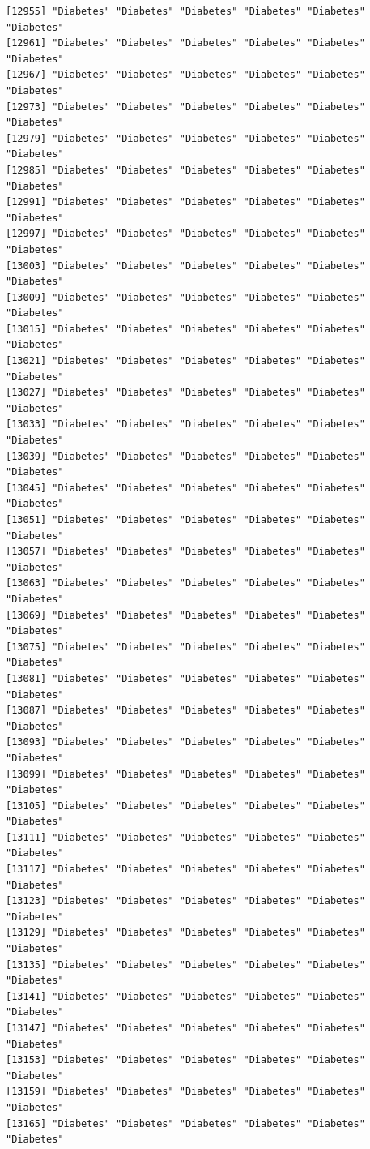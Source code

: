 \documentclass[
  letterpaper,
  DIV=11,
  numbers=noendperiod]{scrartcl}
\begin{document}
\begin{verbatim}
[12955] "Diabetes" "Diabetes" "Diabetes" "Diabetes" "Diabetes" "Diabetes"
[12961] "Diabetes" "Diabetes" "Diabetes" "Diabetes" "Diabetes" "Diabetes"
[12967] "Diabetes" "Diabetes" "Diabetes" "Diabetes" "Diabetes" "Diabetes"
[12973] "Diabetes" "Diabetes" "Diabetes" "Diabetes" "Diabetes" "Diabetes"
[12979] "Diabetes" "Diabetes" "Diabetes" "Diabetes" "Diabetes" "Diabetes"
[12985] "Diabetes" "Diabetes" "Diabetes" "Diabetes" "Diabetes" "Diabetes"
[12991] "Diabetes" "Diabetes" "Diabetes" "Diabetes" "Diabetes" "Diabetes"
[12997] "Diabetes" "Diabetes" "Diabetes" "Diabetes" "Diabetes" "Diabetes"
[13003] "Diabetes" "Diabetes" "Diabetes" "Diabetes" "Diabetes" "Diabetes"
[13009] "Diabetes" "Diabetes" "Diabetes" "Diabetes" "Diabetes" "Diabetes"
[13015] "Diabetes" "Diabetes" "Diabetes" "Diabetes" "Diabetes" "Diabetes"
[13021] "Diabetes" "Diabetes" "Diabetes" "Diabetes" "Diabetes" "Diabetes"
[13027] "Diabetes" "Diabetes" "Diabetes" "Diabetes" "Diabetes" "Diabetes"
[13033] "Diabetes" "Diabetes" "Diabetes" "Diabetes" "Diabetes" "Diabetes"
[13039] "Diabetes" "Diabetes" "Diabetes" "Diabetes" "Diabetes" "Diabetes"
[13045] "Diabetes" "Diabetes" "Diabetes" "Diabetes" "Diabetes" "Diabetes"
[13051] "Diabetes" "Diabetes" "Diabetes" "Diabetes" "Diabetes" "Diabetes"
[13057] "Diabetes" "Diabetes" "Diabetes" "Diabetes" "Diabetes" "Diabetes"
[13063] "Diabetes" "Diabetes" "Diabetes" "Diabetes" "Diabetes" "Diabetes"
[13069] "Diabetes" "Diabetes" "Diabetes" "Diabetes" "Diabetes" "Diabetes"
[13075] "Diabetes" "Diabetes" "Diabetes" "Diabetes" "Diabetes" "Diabetes"
[13081] "Diabetes" "Diabetes" "Diabetes" "Diabetes" "Diabetes" "Diabetes"
[13087] "Diabetes" "Diabetes" "Diabetes" "Diabetes" "Diabetes" "Diabetes"
[13093] "Diabetes" "Diabetes" "Diabetes" "Diabetes" "Diabetes" "Diabetes"
[13099] "Diabetes" "Diabetes" "Diabetes" "Diabetes" "Diabetes" "Diabetes"
[13105] "Diabetes" "Diabetes" "Diabetes" "Diabetes" "Diabetes" "Diabetes"
[13111] "Diabetes" "Diabetes" "Diabetes" "Diabetes" "Diabetes" "Diabetes"
[13117] "Diabetes" "Diabetes" "Diabetes" "Diabetes" "Diabetes" "Diabetes"
[13123] "Diabetes" "Diabetes" "Diabetes" "Diabetes" "Diabetes" "Diabetes"
[13129] "Diabetes" "Diabetes" "Diabetes" "Diabetes" "Diabetes" "Diabetes"
[13135] "Diabetes" "Diabetes" "Diabetes" "Diabetes" "Diabetes" "Diabetes"
[13141] "Diabetes" "Diabetes" "Diabetes" "Diabetes" "Diabetes" "Diabetes"
[13147] "Diabetes" "Diabetes" "Diabetes" "Diabetes" "Diabetes" "Diabetes"
[13153] "Diabetes" "Diabetes" "Diabetes" "Diabetes" "Diabetes" "Diabetes"
[13159] "Diabetes" "Diabetes" "Diabetes" "Diabetes" "Diabetes" "Diabetes"
[13165] "Diabetes" "Diabetes" "Diabetes" "Diabetes" "Diabetes" "Diabetes"

\end{verbatim}
\end{document}
